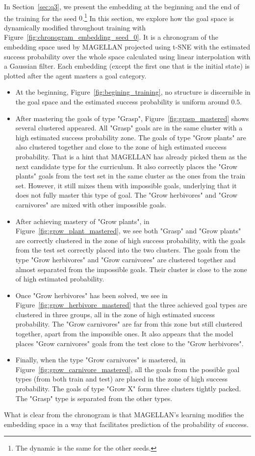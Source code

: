 In Section~\ref{sec:q3}, we present the embedding at the beginning and the end of the training for the seed $0$.\footnote{The dynamic is the same for the other seeds.} In this section, we explore how the goal space is dynamically modified throughout training with Figure~\ref{fig:chronogram_embedding_seed_0}. It is a chronogram of the embedding space used by MAGELLAN projected using t-SNE \cite{JMLR:v9:vandermaaten08a} with the estimated success probability over the whole space calculated using linear interpolation with a Gaussian filter. Each embedding (except the first one that is the initial state) is plotted after the agent masters a goal category.
\begin{itemize}
    \item At the beginning, Figure~\ref{fig:begining_training}, no structure is discernible in the goal space and the estimated success probability is uniform around $0.5$.
    \item After mastering the goals of type "Grasp", Figure~\ref{fig:grasp_mastered} shows several clustered appeared. All "Grasp" goals are in the same cluster with a high estimated success probability zone. The goals of type "Grow plants" are also clustered together and close to the zone of high estimated success probability. That is a hint that MAGELLAN has already picked them as the next candidate type for the curriculum. It also correctly places the "Grow plants" goals from the test set in the same cluster as the ones from the train set. However, it still mixes them with impossible goals, underlying that it does not fully master this type of goal.  The "Grow herbivores" and "Grow carnivores" are mixed with other impossible goals.
    \item After achieving mastery of "Grow plants", in Figure~\ref{fig:grow_plant_mastered}, we see both "Grasp" and "Grow plants" are correctly clustered in the zone of high success probability, with the goals from the test set correctly placed into the two clusters. The goals from the type "Grow herbivores" and "Grow carnivores" are clustered together and almost separated from the impossible goals. Their cluster is close to the zone of high estimated probability.
    \item Once "Grow herbivores" has been solved, we see in Figure~\ref{fig:grow_herbivore_mastered} that the three achieved goal types are clustered in three groups, all in the zone of high estimated success probability. The "Grow carnivores" are far from this zone but still clustered together, apart from the impossible ones. It also appears that the model places "Grow carnivores" goals from the test close to the "Grow herbivores". 
    \item Finally, when the type "Grow carnivores" is mastered, in Figure~\ref{fig:grow_carnivore_mastered}, all the goals from the possible goal types (from both train and test) are placed in the zone of high success probability. The goals of type "Grow X" form three clusters tightly packed. The "Grasp" type is separated from the other types.
\end{itemize}
 What is clear from the chronogram is that MAGELLAN's learning modifies the embedding space in a way that facilitates prediction of the probability of success.  

